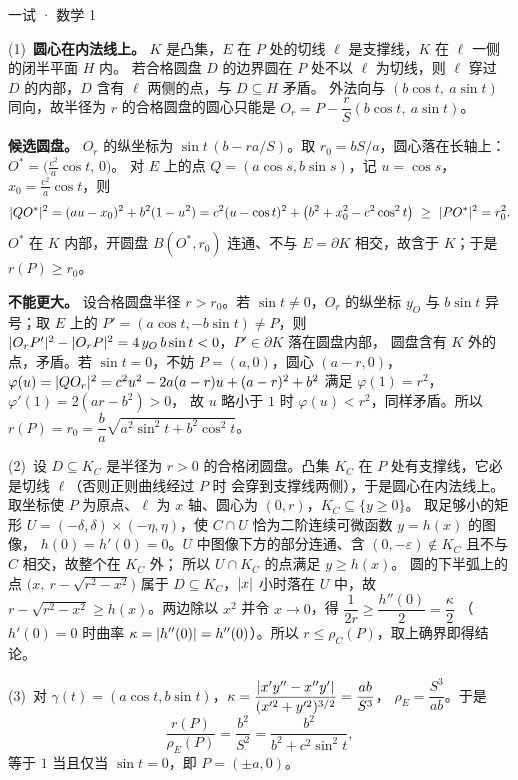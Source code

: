 \documentclass[cjk=noto, seal=first]{mojing-exam}
\begin{document}
\begin{paper}[time={建议 3 小时（训练设置）}, full=150]{一试 · 数学 1}
\begin{questions}
\begin{solution}
(1)~\textbf{圆心在内法线上。} $K$ 是凸集，$E$ 在 $P$ 处的切线 $\ell$ 是支撑线，$K$ 在 $\ell$ 一侧的闭半平面 $H$ 内。
若合格圆盘 $D$ 的边界圆在 $P$ 处不以 $\ell$ 为切线，则 $\ell$ 穿过 $D$ 的内部，$D$ 含有 $\ell$ 两侧的点，与 $D\subseteq H$ 矛盾。
外法向与 $(b\cos t,\ a\sin t)$ 同向，故半径为 $r$ 的合格圆盘的圆心只能是
$O_r=P-\dfrac{r}{S}(b\cos t,\ a\sin t)$。

\textbf{候选圆盘。} $O_r$ 的纵坐标为 $\sin t\,(b-ra/S)$。取 $r_0=bS/a$，圆心落在长轴上：$O^*=\bigl(\tfrac{c^2}{a}\cos t,\,0\bigr)$。
对 $E$ 上的点 $Q=(a\cos s,b\sin s)$，记 $u=\cos s$，$x_0=\tfrac{c^2}{a}\cos t$，则
\[
  \lvert QO^*\rvert^2=(au-x_0)^2+b^2(1-u^2)=c^2(u-\cos t)^2+\bigl(b^2+x_0^2-c^2\cos^2t\bigr)\ \ge\ \lvert PO^*\rvert^2=r_0^2 .
\]
$O^*$ 在 $K$ 内部，开圆盘 $B(O^*,r_0)$ 连通、不与 $E=\partial K$ 相交，故含于 $K$；于是 $r(P)\ge r_0$。

\textbf{不能更大。} 设合格圆盘半径 $r>r_0$。若 $\sin t\ne0$，$O_r$ 的纵坐标 $y_O$ 与 $b\sin t$ 异号；取 $E$ 上的
$P'=(a\cos t,-b\sin t)\ne P$，则 $\lvert O_rP'\rvert^2-\lvert O_rP\rvert^2=4\,y_O\,b\sin t<0$，$P'\in\partial K$ 落在圆盘内部，
圆盘含有 $K$ 外的点，矛盾。若 $\sin t=0$，不妨 $P=(a,0)$，圆心 $(a-r,0)$，
$\varphi(u)=\lvert QO_r\rvert^2=c^2u^2-2a(a-r)u+(a-r)^2+b^2$ 满足 $\varphi(1)=r^2$，$\varphi'(1)=2(ar-b^2)>0$，
故 $u$ 略小于 $1$ 时 $\varphi(u)<r^2$，同样矛盾。所以 $r(P)=r_0=\dfrac ba\sqrt{a^2\sin^2t+b^2\cos^2t}$。

(2)~设 $D\subseteq K_C$ 是半径为 $r>0$ 的合格闭圆盘。凸集 $K_C$ 在 $P$ 处有支撑线，它必是切线 $\ell$（否则正则曲线经过 $P$ 时
会穿到支撑线两侧），于是圆心在内法线上。取坐标使 $P$ 为原点、$\ell$ 为 $x$ 轴、圆心为 $(0,r)$，$K_C\subseteq\{y\ge0\}$。
取足够小的矩形 $U=(-\delta,\delta)\times(-\eta,\eta)$，使 $C\cap U$ 恰为二阶连续可微函数 $y=h(x)$ 的图像，
$h(0)=h'(0)=0$。$U$ 中图像下方的部分连通、含 $(0,-\varepsilon)\notin K_C$ 且不与 $C$ 相交，故整个在 $K_C$ 外；
所以 $U\cap K_C$ 的点满足 $y\ge h(x)$。
圆的下半弧上的点 $\bigl(x,\ r-\sqrt{r^2-x^2}\bigr)$ 属于 $D\subseteq K_C$，$\lvert x\rvert$ 小时落在 $U$ 中，故
$r-\sqrt{r^2-x^2}\ge h(x)$。两边除以 $x^2$ 并令 $x\to0$，得 $\dfrac1{2r}\ge\dfrac{h''(0)}2=\dfrac{\kappa}{2}$
（$h'(0)=0$ 时曲率 $\kappa=\lvert h''(0)\rvert=h''(0)$）。所以 $r\le\rho_C(P)$，取上确界即得结论。

(3)~对 $\gamma(t)=(a\cos t,b\sin t)$，$\kappa=\dfrac{\lvert x'y''-x''y'\rvert}{(x'^2+y'^2)^{3/2}}=\dfrac{ab}{S^3}$，
$\rho_E=\dfrac{S^3}{ab}$。于是
\[
  \frac{r(P)}{\rho_E(P)}=\frac{b^2}{S^2}=\frac{b^2}{b^2+c^2\sin^2t},
\]
等于 $1$ 当且仅当 $\sin t=0$，即 $P=(\pm a,0)$。


\end{solution}
\end{questions}
\end{paper}
\end{document}
